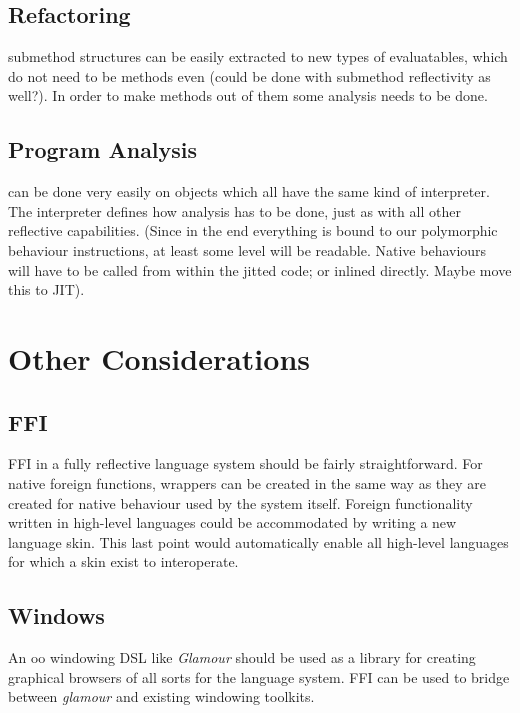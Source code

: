 \documentclass{article}
\begin{document}
\subsection{Refactoring}
submethod structures can be easily extracted to new types of
evaluatables, which do not need to be methods even (could be done with
submethod reflectivity as well?). In order to make methods out of them
some analysis needs to be done.

\subsection{Program Analysis}
can be done very easily on objects which all have the same kind of
interpreter. The interpreter defines how analysis has to be done, just
as with all other reflective capabilities. (Since in the end everything
is bound to our polymorphic behaviour instructions, at least some
level will be readable. Native behaviours will have to be called from
within the jitted code; or inlined directly. Maybe move this to JIT).

\section{Other Considerations}
\subsection{FFI}
FFI in a fully reflective language system should be fairly straightforward.
For native foreign functions, wrappers can be created in the same way as they
are created for native behaviour used by the system itself. Foreign
functionality written in high-level languages could be accommodated by writing
a new language skin. This last point would automatically enable all high-level
languages for which a skin exist to interoperate.

\subsection{Windows}
An oo windowing DSL like \emph{Glamour} should be used as a library for
creating graphical browsers of all sorts for the language system. FFI can be
used to bridge between \emph{glamour} and existing windowing toolkits.
\end{document}
